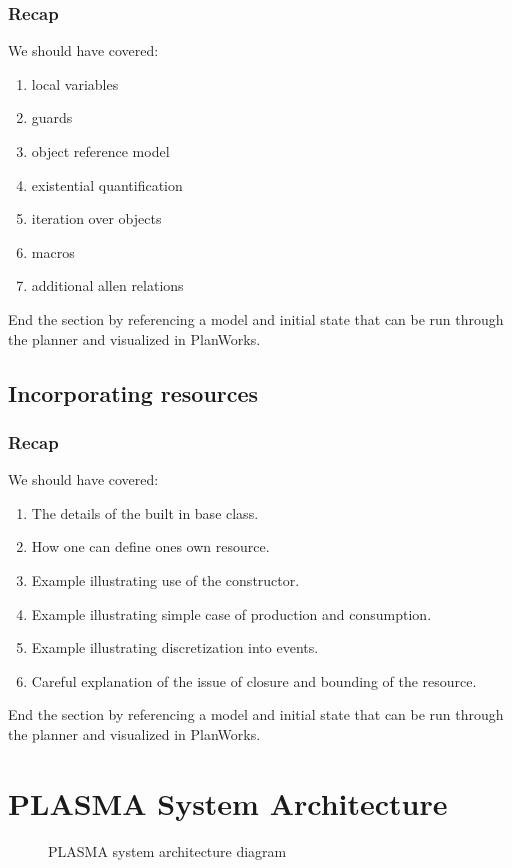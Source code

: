 \documentclass[10pt, letterpaper, twoside]{article}
\begin{document}
\subsubsection{Recap}
We should have covered:
\begin{enumerate}
\item local variables
\item guards
\item object reference model
\item existential quantification
\item iteration over objects
\item macros
\item additional allen relations
\end{enumerate}
End the section by referencing a model and initial state that can be run through the planner and visualized in PlanWorks.

\subsection{Incorporating resources}
\subsubsection{Recap}
We should have covered:
\begin{enumerate}
\item The details of the built in base class. 
\item How one can define ones own resource.
\item Example illustrating use of the constructor.
\item Example illustrating simple case of production and consumption.
\item Example illustrating discretization into events.
\item Careful explanation of the issue of closure and bounding of the resource.
\end{enumerate}

End the section by referencing a model and initial state that can be run through the planner and visualized in PlanWorks.

\section{PLASMA System Architecture}

\begin{figure}[t]
\centering{}
\caption{PLASMA system architecture diagram}
\label{SystemDiagram}
\end{figure}
\end{document}

